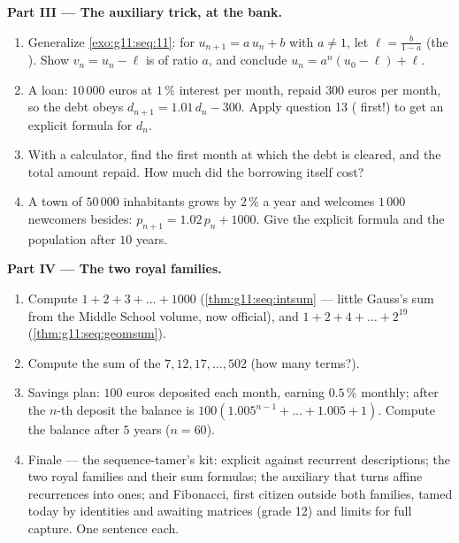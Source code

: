 \begin{problem}
\medskip
\noindent\textbf{Part III --- The auxiliary trick, at the
bank.}
\begin{enumerate}[resume]
  \item Generalize \cref{exo:g11:seq:11}: for
        $u_{n+1} = a\,u_n + b$ with $a \neq 1$, let
        $\ell = \frac{b}{1 - a}$ (the ). Show
        $v_n = u_n - \ell$ is  of ratio $a$, and
        conclude
        $u_n = a^n (u_0 - \ell) + \ell$.
  \item A loan: $10\,000$ euros at $1\,\%$ interest per month,
        repaid $300$ euros per month, so the debt obeys
        $d_{n+1} = 1.01\,d_n - 300$. Apply question 13 ( first!) to get an explicit formula for $d_n$.
  \item With a calculator, find the first month at which the
        debt is cleared, and the total amount repaid. How much
        did the borrowing itself cost?
  \item A town of $50\,000$ inhabitants grows by $2\,\%$ a year
        and welcomes $1\,000$ newcomers besides:
        $p_{n+1} = 1.02\,p_n + 1000$. Give the explicit formula
        and the population after $10$ years.
\end{enumerate}

\medskip
\noindent\textbf{Part IV --- The two royal families.}
\begin{enumerate}[resume]
  \item Compute $1 + 2 + 3 + \dots + 1000$
        (\cref{thm:g11:seq:intsum} --- little Gauss's sum from
        the Middle School volume, now official), and
        $1 + 2 + 4 + \dots + 2^{19}$
        (\cref{thm:g11:seq:geomsum}).
  \item Compute the sum of the 
        $7, 12, 17, \dots, 502$ (how many terms?).
  \item Savings plan: $100$ euros deposited each month, earning
        $0.5\,\%$ monthly; after the $n$-th deposit the balance
        is $100\left(1.005^{n-1} + \dots + 1.005 + 1\right)$.
        Compute the balance after $5$ years ($n = 60$).
  \item Finale --- the sequence-tamer's kit: explicit against
        recurrent descriptions; the two royal families and
        their sum formulas; the auxiliary  that turns
        affine recurrences into  ones; and Fibonacci,
        first citizen outside both families, tamed today by
        identities and awaiting matrices (grade 12) and limits
        for full capture. One sentence each.
\end{enumerate}
\end{problem}
